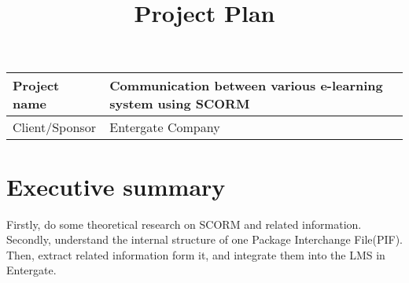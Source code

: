 \documentclass{report}
\begin{document}
 
\title{Project Plan} 
\maketitle 

\begin{table}[h]
	\begin{tabularx}{\textwidth}{| l | X |}
	\hline
	Project name & Communication between various e-learning system using SCORM \\
	\hline
	Client/Sponsor & Entergate Company \\
	\hline
\end{tabularx}
\end{table} 

\section{Executive summary}
Firstly, do some theoretical research on SCORM and related information. Secondly, understand the internal structure of one Package Interchange 
File(PIF). Then, extract related information form it, and integrate them into the LMS in Entergate.
\end{document}
